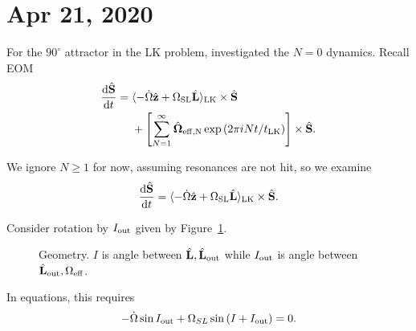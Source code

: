 \documentclass[11pt,
        usenames, %
        dvipsnames, %
        twocolumn,
    ]{article}
\newcommand*{\rd}[2]{\frac{\mathrm{d}#1}{\mathrm{d}#2}}
\newcommand*{\bm}[1]{\boldsymbol{\mathbf{#1}}}
\newcommand*{\uv}[1]{\hat{\bm{#1}}}
\newcommand*{\ev}[1]{\langle#1\rangle}
\newcommand*{\p}[1]{\left(#1\right)}
\newcommand*{\s}[1]{\left[#1\right]}
\begin{document}
\def\Snospace~{\S{}} %
\renewcommand*{\sectionautorefname}{\Snospace}
\renewcommand*{\appendixautorefname}{\Snospace}
\renewcommand*{\figureautorefname}{Fig.}
\renewcommand*{\equationautorefname}{Eq.}
\renewcommand*{\tableautorefname}{Tab.}

\singlespacing

\section{Apr 21, 2020}

For the $90^\circ$ attractor in the LK problem, investigated the $N = 0$
dynamics. Recall EOM
\begin{align}
    \rd{\uv{S}}{t} ={}& \ev{-\dot{\Omega}\uv{z} + \Omega_{\rm SL}\uv{L}}_{\rm LK}
        \times \uv{S}\nonumber\\
        &+ \s{
            \sum\limits_{N = 1}^\infty \uv{\Omega}_{\rm eff, N}
            \exp\p{2\pi i N t / t_{\rm LK}}} \times \uv{S}.
\end{align}

We ignore $N \geq 1$ for now, assuming resonances are not hit, so we examine
\begin{equation}
    \rd{\uv{S}}{t} = \ev{-\dot{\Omega}\uv{z} + \Omega_{\rm SL}\uv{L}}_{\rm LK}
        \times \uv{S}.
\end{equation}

Consider rotation by $I_{\rm out}$ given by Figure~\ref{fig:geometry}.
\begin{figure}[h]
    \centering
    \caption{Geometry. $I$ is angle between $\uv{L}, \uv{L}_{\rm out}$ while
    $I_{\rm out}$ is angle between $\uv{L}_{\rm out}, \Omega_{\rm eff}$.
    }\label{fig:geometry}
\end{figure}
In equations, this requires
\begin{equation}
    -\dot{\Omega} \sin I_{\rm out} + \Omega_{SL}\sin \p{I + I_{\rm out}} = 0.
\end{equation}
\end{document}
